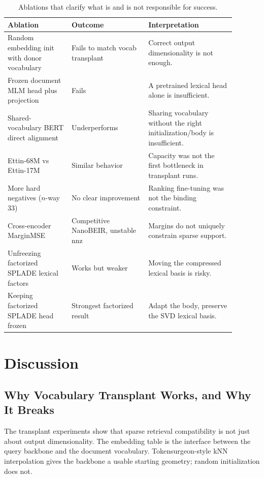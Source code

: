 \documentclass[
]{ceurart}
\begin{document}
\begin{table}[t]
\caption{Ablations that clarify what is and is not responsible for success.}
\label{tab:ablations}
\centering
\begin{tabular}{p{0.25\linewidth}p{0.30\linewidth}p{0.34\linewidth}}
\toprule
Ablation & Outcome & Interpretation \\
\midrule
Random embedding init with donor vocabulary & Fails to match vocab transplant & Correct output dimensionality is not enough. \\
Frozen document MLM head plus projection & Fails & A pretrained lexical head alone is insufficient. \\
Shared-vocabulary BERT direct alignment & Underperforms & Sharing vocabulary without the right initialization/body is insufficient. \\
Ettin-68M vs Ettin-17M & Similar behavior & Capacity was not the first bottleneck in transplant runs. \\
More hard negatives ($n$-way 33) & No clear improvement & Ranking fine-tuning was not the binding constraint. \\
Cross-encoder MarginMSE & Competitive NanoBEIR, unstable nnz & Margins do not uniquely constrain sparse support. \\
Unfreezing factorized SPLADE lexical factors & Works but weaker & Moving the compressed lexical basis is risky. \\
Keeping factorized SPLADE head frozen & Strongest factorized result & Adapt the body, preserve the SVD lexical basis. \\
\bottomrule
\end{tabular}
\end{table}

\section{Discussion}

\subsection{Why Vocabulary Transplant Works, and Why It Breaks}

The transplant experiments show that sparse retrieval compatibility is not just
about output dimensionality. The embedding table is the interface between the
query backbone and the document vocabulary. Tokensurgeon-style kNN
interpolation gives the backbone a usable starting geometry; random
initialization does not.
\end{document}
